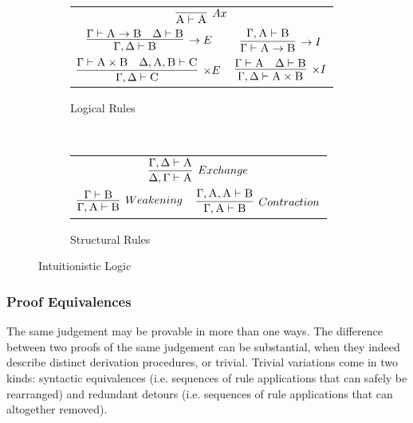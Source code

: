\begin{figure}
	\centering
	\begin{subfigure}{1\textwidth}
		\centering
		\begin{tabularx}{0.7\textwidth}{@{}C@{\qquad}C@{}}
		\\[1em]
		$\infer[\to E]{\Gamma, \Delta \vdash \prop B}{\Gamma \vdash \prop A \to \prop B & \Delta \vdash \prop B}$ 
		& 
		$\infer[\to I]{\Gamma \vdash \prop A \to \prop B}{\Gamma, \prop A \vdash \prop B}$\\[1em]
		$\infer[\times E]{\Gamma,\Delta \vdash \prop C}{\Gamma \vdash \prop A \times \prop B & \Delta, \prop A , \prop B \vdash \prop C}$ 
		&
		$\infer[\times I]{\Gamma, \Delta \vdash \prop A \times \prop B}{\Gamma \vdash \prop A & \Delta \vdash \prop B}$
		\end{tabularx}
		\caption{Logical Rules}
		\label{subfigure:intuitionistic_logic_rules:logical}
	\end{subfigure}\\[1em]
	\begin{subfigure}{1\textwidth}
		\centering
		\begin{tabularx}{0.7\textwidth}{@{}C@{\qquad}C@{}}
		\\[1em]
		$\infer[Weakening]{\Gamma, \prop A \vdash \prop B}{\Gamma \vdash \prop B} $ 
		&
		$\infer[Contraction]{\Gamma, \prop A \vdash \prop B}{\Gamma, \prop A, \prop A \vdash \prop B}$
		\end{tabularx}
		\caption{Structural Rules}
		\label{subfigure:intuitionistic_logic_rules:structural}
	\end{subfigure}
	\caption{Intuitionistic Logic}
	\label{figure:intuitioistic_logic_rules}
\end{figure}

\subsubsection{Proof Equivalences}
The same judgement may be provable in more than one ways.
The difference between two proofs of the same judgement can be substantial, when they indeed describe distinct derivation procedures, or trivial.
Trivial variations come in two kinds: syntactic equivalences (i.e. sequences of rule applications that can safely be rearranged) and redundant detours (i.e. sequences of rule applications that can altogether removed).

